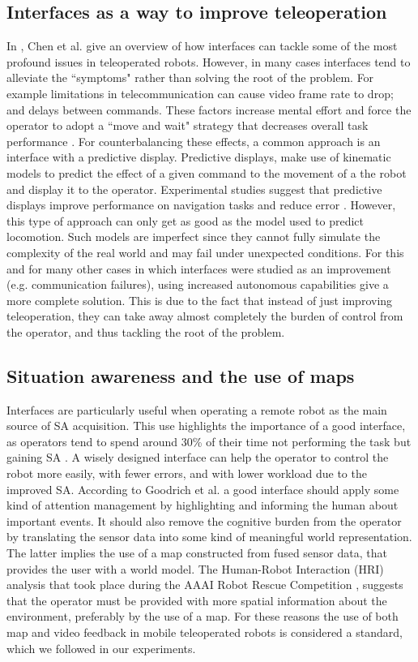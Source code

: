 \documentclass[a4paper,12pt,oneside,openright]{bhamthesis}
\begin{document}
\subsection{Interfaces as a way to improve teleoperation}
In \cite{Chen2007}, Chen et al. give an overview of how interfaces can tackle some of the most profound issues in teleoperated robots. However, in many cases interfaces tend to alleviate the ``symptoms" rather than solving the root of the problem. For example limitations in telecommunication can cause video frame rate to drop; and delays between commands. These factors increase mental effort and force the operator to adopt a ``move and wait" strategy \cite{Ferrell1965} that decreases overall task performance \cite{CordeLane2002}. For counterbalancing these effects, a common approach is an interface with a predictive display. Predictive displays, make use of kinematic models to predict the effect of a given command to the movement of a the robot and display it to the operator. Experimental studies suggest that predictive displays improve performance on navigation tasks and reduce error \cite{Ricks2004,Matheson2013}. However, this type of approach can only get as good as the model used to predict locomotion. Such models are imperfect since they cannot fully simulate the complexity of the real world and may fail under unexpected conditions. For this and for many other cases in which interfaces were studied as an improvement (e.g. communication failures), using increased autonomous capabilities give a more complete solution. This is due to the fact that instead of just improving teleoperation, they can take away almost completely the burden of control from the operator, and thus tackling the root of the problem. 

\subsection{Situation awareness and the use of maps}
Interfaces are particularly useful when operating a remote robot as the main source of SA acquisition. This use highlights the importance of a good interface, as operators tend to spend around 30\% of their time not performing the task but gaining SA \cite{Yanco_HRI_SA_04}. A wisely designed interface can help the operator to control the robot more easily, with fewer errors, and with lower workload due to the improved SA. According to Goodrich et al. \cite{Goodrich2003} a good interface should apply some kind of attention management by highlighting and informing the human about important events. It should also remove the cognitive burden from the operator by translating the sensor data into some kind of meaningful world representation. The latter implies the use of a map constructed from fused sensor data, that provides the user with a world model. The Human-Robot Interaction (HRI) analysis that took place during the AAAI Robot Rescue Competition \cite{Yanco2004}, suggests that the operator must be provided with more spatial information about the environment, preferably by the use of a map. For these reasons the use of both map and video feedback in mobile teleoperated robots is considered a standard, which we followed in our experiments. 
\end{document}
